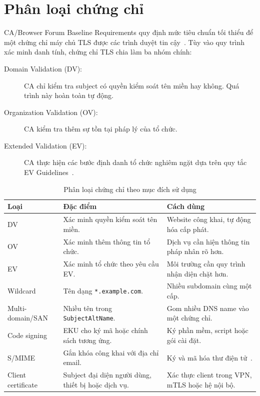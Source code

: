 \section{Phân loại chứng chỉ}
\label{sec:4.6}

CA/Browser Forum Baseline Requirements quy định mức tiêu chuẩn tối thiểu để một chứng chỉ máy chủ TLS được các trình duyệt tin cậy~\cite{CABForum}. Tùy vào quy trình xác minh danh tính, chứng chỉ TLS chia làm ba nhóm chính:
\begin{description}
    \item[Domain Validation (DV):] CA chỉ kiểm tra subject có quyền kiểm soát tên miền hay không. Quá trình này hoàn toàn tự động.
    \item[Organization Validation (OV):] CA kiểm tra thêm sự tồn tại pháp lý của tổ chức.
    \item[Extended Validation (EV):] CA thực hiện các bước định danh tổ chức nghiêm ngặt dựa trên quy tắc EV Guidelines~\cite{CABForumEV}.
\end{description}

\begin{table}[ht]
    \centering
    \caption{Phân loại chứng chỉ theo mục đích sử dụng}
    \label{tab:cert-types}
    \small
    \begin{tabularx}{\textwidth}{@{}p{}p{}p{}@{}}
        \toprule
        \textbf{Loại} & \textbf{Đặc điểm} & \textbf{Cách dùng} \\
        \midrule
        DV
            & Xác minh quyền kiểm soát tên miền.
            & Website công khai, tự động hóa cấp phát. \\
        OV
            & Xác minh thêm thông tin tổ chức.
            & Dịch vụ cần hiện thông tin pháp nhân rõ hơn. \\
        EV
            & Xác minh tổ chức theo yêu cầu EV.
            & Môi trường cần quy trình nhận diện chặt hơn. \\
        Wildcard
            & Tên dạng \texttt{*.example.com}.
            & Nhiều subdomain cùng một cấp. \\
        Multi-domain/SAN
            & Nhiều tên trong \texttt{SubjectAltName}.
            & Gom nhiều DNS name vào một chứng chỉ. \\
        Code signing
            & EKU cho ký mã hoặc chính sách tương ứng.
            & Ký phần mềm, script hoặc gói cài đặt. \\
        S/MIME
            & Gắn khóa công khai với địa chỉ email.
            & Ký và mã hóa thư điện tử~\cite{RFC8551}. \\
        Client certificate
            & Subject đại diện người dùng, thiết bị hoặc dịch vụ.
            & Xác thực client trong VPN, mTLS hoặc hệ nội bộ. \\
        \bottomrule
    \end{tabularx}
\end{table}

